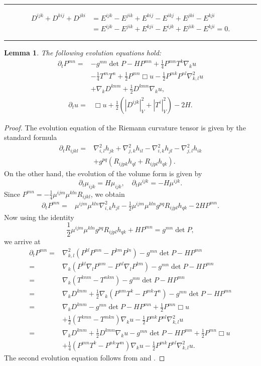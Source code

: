 \documentclass{amsart}
\newtheorem{lemma}[theorem]{Lemma}
\theoremstyle{definition}
\theoremstyle{remark}
\numberwithin{equation}{section}
\newenvironment{note}{\hrule}{\hrule}
\begin{document}
\begin{note}
\[
\begin{split}
D^{ijk} + D^{kij} + D^{jki} &= E^{ijk}-E^{jik} + E^{kij}-E^{ikj} + E^{jki}-E^{kji} \\
&= E^{ijk}-E^{jik} + E^{kji}-E^{ijk} + E^{jik}-E^{kji} = 0.
\end{split}
\]
\end{note}

\begin{lemma}\label{ev u}
The following evolution equations hold:
\begin{align*}
\partial_tP^{mn}
=&-g^{mn}\det P-HP^{mn}+\frac{1}{4}P^{mn}T^k\nabla_ku\\
&-\frac{1}{4}T^mT^n+\frac{1}{2}P^{mn}\Box u-\frac{1}{2}P^{mk}P^{nl}\nabla^2_{k,l}u\\
&+\nabla_kD^{knm}+\frac{1}{2}D^{kmn}\nabla_ku,
\end{align*}
\begin{align*}
\partial_t u=&\Box u+\frac{1}{2}\left(\left|D^{ijk}\right|^2_V+\left|T^i\right|_V^2\right)-2H.
\end{align*}
\end{lemma}
\begin{proof}
The evolution equation of the Riemann curvature tensor is given by the standard formula
\begin{align*}
\partial_t R_{ijkl}=&\nabla^2_{i,l}h_{jk}+\nabla^2_{j,k}h_{il}-\nabla^2_{i,k}h_{jl}-\nabla^2_{j,l}h_{ik}\\
&+g^{pq}(R_{ijpk}h_{ql}+R_{ijpl}h_{qk}).
\end{align*}
On the other hand, the evolution of the volume form is given by $$\partial_t\mu_{ijk}=H\mu_{ijk},\quad\partial_t\mu^{ijk}=-H\mu^{ijk}.$$
Since $P^{mn}=-\frac{1}{4}\mu^{ijm}\mu^{kln}R_{ijkl}$, we obtain
\begin{align*}
\partial_tP^{mn}=&\mu^{ijm}\mu^{kln}\nabla^2_{i,k}h_{jl}-\frac{1}{2}\mu^{ijm}\mu^{kln}g^{pq}R_{ijpl}h_{qk}-2HP^{mn}.
\end{align*}
Now using the identity
\[\frac{1}{2}\mu^{ijm}\mu^{kln}g^{pq}R_{ijpl}h_{qk}+HP^{mn}=g^{mn}\det P,\]
we arrive at
\begin{align*}
\partial_tP^{mn}=&\nabla^2_{k,l}(P^{kl}P^{mn}-P^{km}P^{ln})-g^{mn}\det P-HP^{mn}\\
=&\nabla_k(P^{kl}\nabla_lP^{nm}-P^{nl}\nabla_lP^{km})-g^{mn}\det P-HP^{mn}\\
=&\nabla_k\left(T^{knm}-T^{nkm}\right)-g^{mn}\det P-HP^{mn}\\
=&\nabla_kD^{knm}+\frac{1}{2}\nabla_k\left(P^{nm}T^k-P^{mk}T^n\right)-g^{mn}\det P-HP^{mn}\\
=&\nabla_kD^{knm}-g^{mn}\det P-HP^{mn}+\frac{1}{2}P^{mn}\Box u\\
&+\frac{1}{2}\left(T^{kmn}-T^{mkn}\right)\nabla_ku-\frac{1}{2}P^{mk}P^{nl}\nabla^2_{k,l}u\\
=&\nabla_kD^{knm}+\frac{1}{2}D^{kmn}\nabla_ku-g^{mn}\det P-HP^{mn}+\frac{1}{2}P^{mn}\Box u\\
&+\frac{1}{4}\left(P^{mn}T^k-P^{nk}T^m\right)\nabla_ku-\frac{1}{2}P^{mk}P^{nl}\nabla^2_{k,l}u.
\end{align*}
The second evolution equation follows from \cite[Prop. 9]{Chowcross2002} and  \cite[Equ. (4)]{Chowcross2002}.
\end{proof}
\end{document}
